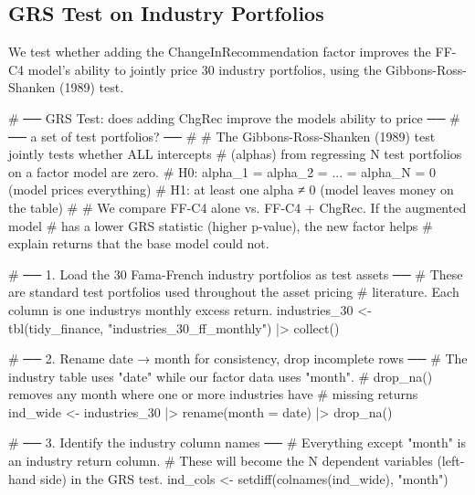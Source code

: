 \documentclass[
  letterpaper,
  DIV=11,
  numbers=noendperiod]{scrartcl}
\newenvironment{Shaded}{\begin{snugshade}}{\end{snugshade}}
\newcommand{\AttributeTok}[1]{\textcolor[rgb]{0.40,0.45,0.13}{#1}}
\newcommand{\CommentTok}[1]{\textcolor[rgb]{0.37,0.37,0.37}{#1}}
\newcommand{\FunctionTok}[1]{\textcolor[rgb]{0.28,0.35,0.67}{#1}}
\newcommand{\NormalTok}[1]{\textcolor[rgb]{0.00,0.23,0.31}{#1}}
\newcommand{\OtherTok}[1]{\textcolor[rgb]{0.00,0.23,0.31}{#1}}
\newcommand{\SpecialCharTok}[1]{\textcolor[rgb]{0.37,0.37,0.37}{#1}}
\newcommand{\StringTok}[1]{\textcolor[rgb]{0.13,0.47,0.30}{#1}}
\begin{document}
\subsection{GRS Test on Industry
Portfolios}\label{grs-test-on-industry-portfolios}

We test whether adding the ChangeInRecommendation factor improves the
FF-C4 model's ability to jointly price 30 industry portfolios, using the
Gibbons-Ross-Shanken (1989) test.

\begin{Shaded}
\begin{Highlighting}[]
\CommentTok{\# ── GRS Test: does adding ChgRec improve the model\textquotesingle{}s ability to price ──}
\CommentTok{\# ── a set of test portfolios?                                         ──}
\CommentTok{\#}
\CommentTok{\# The Gibbons{-}Ross{-}Shanken (1989) test jointly tests whether ALL intercepts}
\CommentTok{\# (alphas) from regressing N test portfolios on a factor model are zero.}
\CommentTok{\# H0: alpha\_1 = alpha\_2 = ... = alpha\_N = 0  (model prices everything)}
\CommentTok{\# H1: at least one alpha ≠ 0  (model leaves money on the table)}
\CommentTok{\#}
\CommentTok{\# We compare FF{-}C4 alone vs. FF{-}C4 + ChgRec. If the augmented model}
\CommentTok{\# has a lower GRS statistic (higher p{-}value), the new factor helps}
\CommentTok{\# explain returns that the base model could not.}

\CommentTok{\# ── 1. Load the 30 Fama{-}French industry portfolios as test assets ──}
\CommentTok{\# These are standard test portfolios used throughout the asset pricing}
\CommentTok{\# literature. Each column is one industry\textquotesingle{}s monthly excess return.}
\NormalTok{industries\_30 }\OtherTok{\textless{}{-}} \FunctionTok{tbl}\NormalTok{(tidy\_finance, }\StringTok{"industries\_30\_ff\_monthly"}\NormalTok{) }\SpecialCharTok{|\textgreater{}} \FunctionTok{collect}\NormalTok{()}

\CommentTok{\# ── 2. Rename date → month for consistency, drop incomplete rows ──}
\CommentTok{\# The industry table uses "date" while our factor data uses "month".}
\CommentTok{\# drop\_na() removes any month where one or more industries have}
\CommentTok{\# missing returns}
\NormalTok{ind\_wide }\OtherTok{\textless{}{-}}\NormalTok{ industries\_30 }\SpecialCharTok{|\textgreater{}}
  \FunctionTok{rename}\NormalTok{(}\AttributeTok{month =}\NormalTok{ date) }\SpecialCharTok{|\textgreater{}} 
  \FunctionTok{drop\_na}\NormalTok{()}

\CommentTok{\# ── 3. Identify the industry column names ──}
\CommentTok{\# Everything except "month" is an industry return column.}
\CommentTok{\# These will become the N dependent variables (left{-}hand side) in the GRS test.}
\NormalTok{ind\_cols }\OtherTok{\textless{}{-}} \FunctionTok{setdiff}\NormalTok{(}\FunctionTok{colnames}\NormalTok{(ind\_wide), }\StringTok{"month"}\NormalTok{)}


\end{Highlighting}
\end{Shaded}
\end{document}
